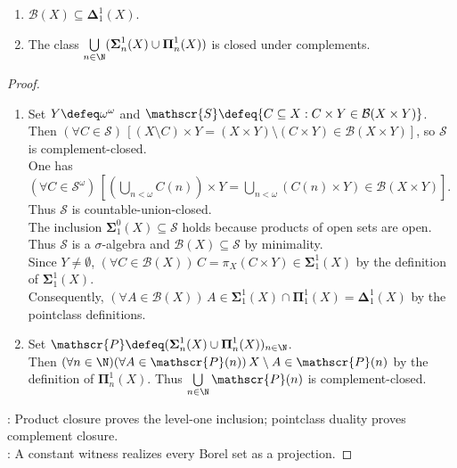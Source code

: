 \begin{proposition} \label{prop:borel-sets-are-delta-one-one} 
\begin{enumerate}[label=(\roman*)]
\setlength{\itemsep}{0pt}
\item $\mathcal{B}(X)\subseteq\boldsymbol{\Delta}^{1}_{1}(X)$.
\item The class $\bigcup\limits_{n\in\N}(\boldsymbol{\Sigma}^{1}_{n}(X)\cup\boldsymbol{\Pi}^{1}_{n}(X))$ is closed under complements.
\end{enumerate}
\begin{proof}
\begin{enumerate}[label=(\roman*)]
\setlength{\itemsep}{0pt}
\item Set $Y\defeq\omega^{\omega}$ and $\mathscr{S}\defeq\{C\subseteq X:C\times Y\in\mathcal{B}(X\times Y)\}$.\\
Then $(\forall C\in\mathscr{S})\,[(X\setminus C)\times Y=(X\times Y)\setminus(C\times Y)\in\mathcal{B}(X\times Y)]$, so $\mathscr{S}$ is complement-closed.\\
One has $(\forall C\in\mathscr{S}^{\omega})\,[(\bigcup\limits_{n<\omega}C(n))\times Y=\bigcup\limits_{n<\omega}(C(n)\times Y)\in\mathcal{B}(X\times Y)]$. Thus $\mathscr{S}$ is countable-union-closed.\\
The inclusion $\boldsymbol{\Sigma}^{0}_{1}(X)\subseteq\mathscr{S}$ holds because products of open sets are open. Thus $\mathscr{S}$ is a $\sigma$-algebra and $\mathcal{B}(X)\subseteq\mathscr{S}$ by minimality.\\
Since $Y\neq\emptyset$, $(\forall C\in\mathcal{B}(X))\,C=\pi_X(C\times Y)\in\boldsymbol{\Sigma}^{1}_{1}(X)$ by the definition of $\boldsymbol{\Sigma}^{1}_{1}(X)$.\\
Consequently, $(\forall A\in\mathcal{B}(X))\,A\in\boldsymbol{\Sigma}^{1}_{1}(X)\cap\boldsymbol{\Pi}^{1}_{1}(X)=\boldsymbol{\Delta}^{1}_{1}(X)$ by the pointclass definitions.
\item Set $\mathscr{P}\defeq(\boldsymbol{\Sigma}^{1}_{n}(X)\cup\boldsymbol{\Pi}^{1}_{n}(X))_{n\in\N}$.\\
Then $(\forall n\in\N)(\forall A\in\mathscr{P}(n))\,X\setminus A\in\mathscr{P}(n)$ by the definition of $\boldsymbol{\Pi}^{1}_{n}(X)$. Thus $\bigcup\limits_{n\in\N}\mathscr{P}(n)$ is complement-closed.
\end{enumerate}
: Product closure proves the level-one inclusion; pointclass duality proves complement closure.\\
: A constant witness realizes every Borel set as a projection.
\end{proof}
\end{proposition}

